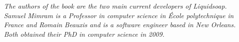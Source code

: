 \documentclass[
coverwidth=6in,
coverheight=9in,
spinewidth=0.5765in, %
bleedwidth=.125in,
12pt,
marklength=0in,
]{bookcover}
\begin{document}
\begin{bookcover}
{\begin{minipage}[t]{\coverwidth}
\begin{center}
\begin{minipage}{.83\textwidth}
\begin{onehalfspace}
\begin{adjustwidth}{1cm}{1cm}
              \vspace{1cm}

              \emph{The authors of the book are the two main current developers
                of Liquidsoap. Samuel Mimram is a Professor in computer science
                in École polytechnique in France and Romain Beauxis and is a
                software engineer based in New Orleans. Both obtained their PhD
                in computer science in 2009.}
            \end{adjustwidth}
          \end{onehalfspace}

          \vspace{60mm}

        \end{minipage}
      \end{center}
    \end{minipage}
    \vfill
    \vspace{1cm}
  }
\end{bookcover}
\end{document}
